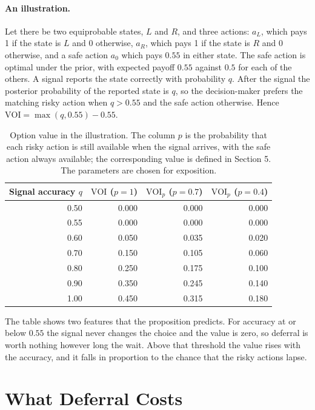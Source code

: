 \documentclass[11pt]{article}
\theoremstyle{remark}
\begin{document}
\paragraph{An illustration.} Let there be two equiprobable states, $L$ and $R$, and three actions: $a_L$, which pays 1 if the state is $L$ and 0 otherwise, $a_R$, which pays 1 if the state is $R$ and 0 otherwise, and a safe action $a_0$ which pays $0.55$ in either state. The safe action is optimal under the prior, with expected payoff $0.55$ against $0.5$ for each of the others. A signal reports the state correctly with probability $q$. After the signal the posterior probability of the reported state is $q$, so the decision-maker prefers the matching risky action when $q>0.55$ and the safe action otherwise. Hence $\mathrm{VOI}=\max(q,0.55)-0.55$.

\begin{table}[ht]
\centering
\small
\begin{tabular}{rrrr}
\toprule
Signal accuracy $q$ & $\mathrm{VOI}$ ($p=1$) & $\mathrm{VOI}_p$ ($p=0.7$) & $\mathrm{VOI}_p$ ($p=0.4$) \\
\midrule
0.50 & 0.000 & 0.000 & 0.000 \\
0.55 & 0.000 & 0.000 & 0.000 \\
0.60 & 0.050 & 0.035 & 0.020 \\
0.70 & 0.150 & 0.105 & 0.060 \\
0.80 & 0.250 & 0.175 & 0.100 \\
0.90 & 0.350 & 0.245 & 0.140 \\
1.00 & 0.450 & 0.315 & 0.180 \\
\bottomrule
\end{tabular}
\caption{Option value in the illustration. The column $p$ is the probability that each risky action is still available when the signal arrives, with the safe action always available; the corresponding value is defined in Section 5. The parameters are chosen for exposition.}
\end{table}

The table shows two features that the proposition predicts. For accuracy at or below $0.55$ the signal never changes the choice and the value is zero, so deferral is worth nothing however long the wait. Above that threshold the value rises with the accuracy, and it falls in proportion to the chance that the risky actions lapse.

\section{What Deferral Costs}
\end{document}
